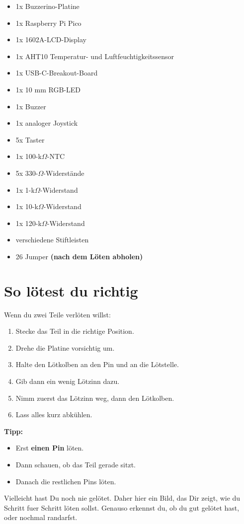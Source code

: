 \documentclass[a4paper,11pt]{article}
\begin{document}
\begin{itemize}
    \item 1x Buzzerino-Platine
    \item 1x Raspberry Pi Pico
    \item 1x 1602A-LCD-Display
    \item 1x AHT10 Temperatur- und Luftfeuchtigkeitssensor
    \item 1x USB-C-Breakout-Board
    \item 1x 10 mm RGB-LED
    \item 1x Buzzer
    \item 1x analoger Joystick
    \item 5x Taster
    \item 1x 100-k$\Omega$-NTC
    \item 5x 330-$\Omega$-Widerstände
    \item 1x 1-k$\Omega$-Widerstand
    \item 1x 10-k$\Omega$-Widerstand
    \item 1x 120-k$\Omega$-Widerstand
    \item verschiedene Stiftleisten
    \item 26 Jumper \textbf{(nach dem Löten abholen)}
\end{itemize}

\section*{So lötest du richtig}

Wenn du zwei Teile verlöten willst:

\begin{enumerate}
    \item Stecke das Teil in die richtige Position.
    \item Drehe die Platine vorsichtig um.
    \item Halte den Lötkolben an den Pin und an die Lötstelle.
    \item Gib dann ein wenig Lötzinn dazu.
    \item Nimm zuerst das Lötzinn weg, dann den Lötkolben.
    \item Lass alles kurz abkühlen.
\end{enumerate}

\textbf{Tipp:}
\begin{itemize}
    \item Erst \textbf{einen Pin} löten.
    \item Dann schauen, ob das Teil gerade sitzt.
    \item Danach die restlichen Pins löten.
\end{itemize}
Vielleicht hast Du noch nie gelötet. Daher hier ein Bild, das Dir zeigt, wie du Schritt fuer Schritt löten sollst. Genauso erkennst du, ob du gut gelötet hast, oder nochmal randarfst. 
\end{document}
